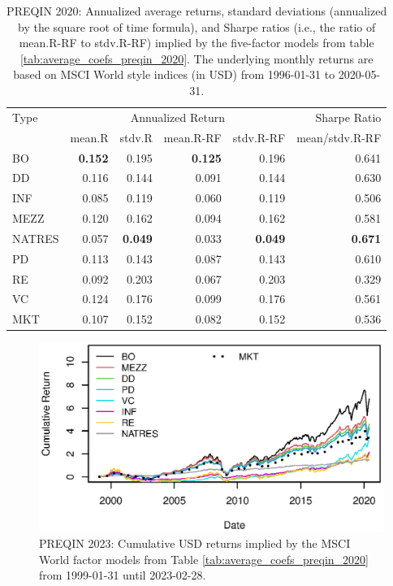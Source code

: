 \begin{table}[ht]
	\centering
	\begin{tabular}{lrrrrr}
		Type & \multicolumn{4}{c}{Annualized Return} & Sharpe Ratio \\ 
		\cmidrule(r){2-5}
		& mean.R & stdv.R & mean.R-RF & stdv.R-RF & mean/stdv.R-RF \\ 
		\hline
		\hline
		BO & \textbf{0.152} & 0.195 & \textbf{0.125} & 0.196 & 0.641 \\ 
		DD & 0.116 & 0.144 & 0.091 & 0.144 & 0.630 \\ 
		INF & 0.085 & 0.119 & 0.060 & 0.119 & 0.506 \\ 
		MEZZ & 0.120 & 0.162 & 0.094 & 0.162 & 0.581 \\ 
		NATRES & 0.057 & \textbf{0.049} & 0.033 & \textbf{0.049} & \textbf{0.671} \\ 
		PD & 0.113 & 0.143 & 0.087 & 0.143 & 0.610 \\ 
		RE & 0.092 & 0.203 & 0.067 & 0.203 & 0.329 \\ 
		VC & 0.124 & 0.176 & 0.099 & 0.176 & 0.561 \\ 
		\hline
		MKT & 0.107 & 0.152 & 0.082 & 0.152 & 0.536 \\ 
		\hline
		\hline
	\end{tabular}
	\caption{
		PREQIN 2020: 
		Annualized average returns, standard deviations (annualized by the square root of time formula), and Sharpe ratios (i.e., the ratio of mean.R-RF to stdv.R-RF) implied by the five-factor models from table \ref{tab:average_coefs_preqin_2020}. 
		The underlying monthly returns are based on MSCI World style indices (in USD) from 1996-01-31 to 2020-05-31.
	} 
	\label{tab:ann_returns_preqin_2020}
\end{table}


\begin{figure}[H]
	\centering
	\includegraphics{Figures/Cumulative_Returns_2020.eps}
	\caption{
		PREQIN 2023: Cumulative USD returns implied by the MSCI World factor models from Table \ref{tab:average_coefs_preqin_2020} from 1999-01-31 until 2023-02-28.}
	\label{fig:cum_returns_preqin}   
\end{figure}




